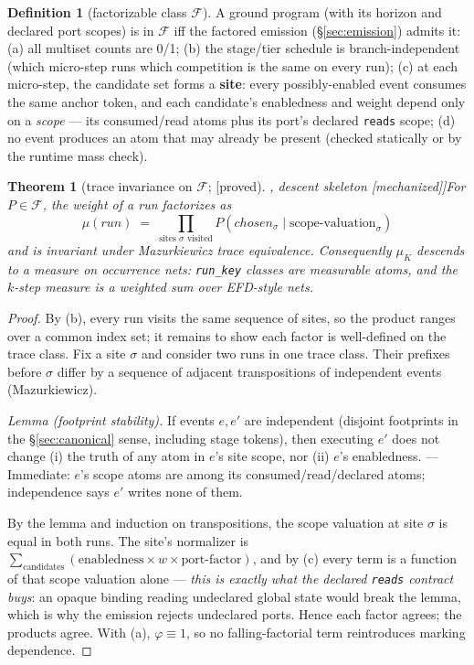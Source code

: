 \documentclass[11pt]{article}
\newcommand{\cclass}{\mathcal{F}}                  %
\newcommand{\stproved}{[\textsf{proved}]}
\newcommand{\stmech}{[\textsf{mechanized}]}
\theoremstyle{plain}
\newtheorem{theorem}{Theorem}
\theoremstyle{definition}
\newtheorem*{definition}{Definition}
\theoremstyle{remark}
\begin{document}
\begin{definition}[factorizable class $\cclass$]
A ground program (with its horizon and declared port scopes) is in
$\cclass$ iff the factored emission (\S\ref{sec:emission}) admits it:
(a) all multiset counts are 0/1; (b) the stage/tier schedule is
branch-independent (which micro-step runs which competition is the same
on every run); (c) at each micro-step, the candidate set forms a
\textbf{site}: every possibly-enabled event consumes the same anchor
token, and each candidate's enabledness and weight depend only on a
\emph{scope} --- its consumed/read atoms plus its port's declared
\texttt{reads} scope; (d) no event produces an atom that may already be
present (checked statically or by the runtime mass check).
\end{definition}

\begin{theorem}[trace invariance on $\cclass$; \stproved{}, descent
skeleton \stmech{}]\label{thm:trace}
For $P \in \cclass$, the weight of a run factorizes as
\[
  \mu(\mathit{run}) \;=\; \prod_{\text{sites } \sigma \text{ visited}}
    P(\mathit{chosen}_\sigma \mid \text{scope-valuation}_\sigma)
\]
and is invariant under Mazurkiewicz trace equivalence. Consequently
$\mu_K$ descends to a measure on occurrence nets: \texttt{run\_key}
classes are measurable atoms, and the $k$-step measure is a weighted sum
over EFD-style nets.
\end{theorem}

\begin{proof}
By (b), every run visits the same sequence of sites, so the product
ranges over a common index set; it remains to show each factor is
well-defined on the trace class. Fix a site $\sigma$ and consider two
runs in one trace class. Their prefixes before $\sigma$ differ by a
sequence of adjacent transpositions of independent events
(Mazurkiewicz).

\emph{Lemma (footprint stability).} If events $e, e'$ are independent
(disjoint footprints in the \S\ref{sec:canonical} sense, including
stage tokens), then executing $e'$ does not change (i) the truth of any
atom in $e$'s site scope, nor (ii) $e$'s enabledness. --- Immediate:
$e$'s scope atoms are among its consumed/read/declared atoms;
independence says $e'$ writes none of them.

By the lemma and induction on transpositions, the scope valuation at
site $\sigma$ is equal in both runs. The site's normalizer is
$\sum_{\text{candidates}} (\text{enabledness} \times w \times
\text{port-factor})$, and by (c) every term is a function of that scope
valuation alone --- \emph{this is exactly what the declared
\texttt{reads} contract buys}: an opaque binding reading undeclared
global state would break the lemma, which is why the emission rejects
undeclared ports. Hence each factor agrees; the products agree. With
(a), $\varphi \equiv 1$, so no falling-factorial term reintroduces
marking dependence.
\end{proof}
\end{document}
